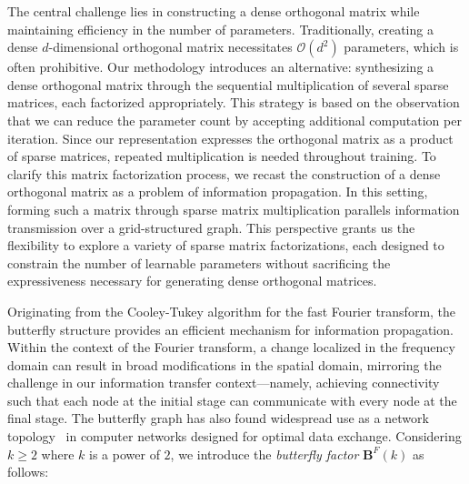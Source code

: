 The central challenge lies in constructing a dense orthogonal matrix while maintaining efficiency in the number of parameters. Traditionally, creating a dense $d$-dimensional orthogonal matrix necessitates $\mathcal{O}(d^2)$ parameters, which is often prohibitive. Our methodology introduces an alternative: synthesizing a dense orthogonal matrix through the sequential multiplication of several sparse matrices, each factorized appropriately. This strategy is based on the observation that we can reduce the parameter count by accepting additional computation per iteration. Since our representation expresses the orthogonal matrix as a product of sparse matrices, repeated multiplication is needed throughout training. To clarify this matrix factorization process, we recast the construction of a dense orthogonal matrix as a problem of information propagation. In this setting, forming such a matrix through sparse matrix multiplication parallels information transmission over a grid-structured graph. This perspective grants us the flexibility to explore a variety of sparse matrix factorizations, each designed to constrain the number of learnable parameters without sacrificing the expressiveness necessary for generating dense orthogonal matrices.

Originating from the Cooley-Tukey algorithm for the fast Fourier transform, the butterfly structure provides an efficient mechanism for information propagation. Within the context of the Fourier transform, a change localized in the frequency domain can result in broad modifications in the spatial domain, mirroring the challenge in our information transfer context—namely, achieving connectivity such that each node at the initial stage can communicate with every node at the final stage. The butterfly graph has also found widespread use as a network topology~\cite{solihin2015fundamentals,li2011linear} in computer networks designed for optimal data exchange. Considering $k\geq 2$ where $k$ is a power of $2$, we introduce the \emph{butterfly factor} $\bm{B}^F(k)$ as follows:

